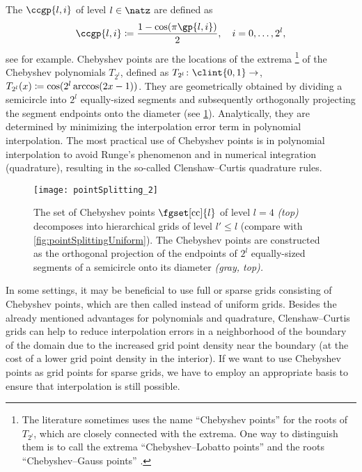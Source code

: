 The  $\ccgp{l,i}$ of level $l \in \natz$
are defined as
\begin{equation}
  \ccgp{l,i}
  \ceq \frac{1 - \cos(\pi \gp{l,i})}{2},\quad
  i = 0, \dotsc, 2^l,
\end{equation}
see \cite{Xu16Chebyshev} for example.
Chebyshev points are the locations of the extrema%
\footnote{%
  The literature sometimes uses the name ``Chebyshev points'' for
  the roots of $T_{2^l}$, which are closely connected with the extrema.
  One way to distinguish them is to call the extrema
  ``Chebyshev--Lobatto points'' and the roots
  ``Chebyshev--Gauss points'' \cite{Xu16Chebyshev}.%
}
of the Chebyshev polynomials $T_{2^l}$, defined as
$T_{2^l}\colon \clint{0, 1} \to \real$,
$T_{2^l}(x) \coloneqq \cos(2^l \arccos(2x - 1))$.
They are geometrically obtained
by dividing a semicircle into $2^l$ equally-sized
segments and subsequently orthogonally projecting the
segment endpoints onto the diameter
(see \cref{fig:pointSplittingChebyshev}).
Analytically, they are determined by minimizing
the interpolation error term in polynomial interpolation.
The most practical use of Chebyshev points is in
polynomial interpolation to avoid Runge's phenomenon and in
numerical integration (quadrature), resulting in the
so-called Clenshaw--Curtis quadrature rules.

\begin{SCfigure}
  \texttt{[image: pointSplitting\_2]}%
  \caption[%
    Decomposition of the set of univariate Clenshaw--Curtis grid points%
  ]{%
    The set of Chebyshev points $\fgset[\cc]{l}$ of level
    $l = 4$ \emph{(top)}
    decomposes into hierarchical grids of level $l' \le l$
    (compare with \cref{fig:pointSplittingUniform}).
    The Chebyshev points are constructed as
    the orthogonal projection of the
    endpoints of $2^l$ equally-sized segments
    of a semicircle onto its diameter \emph{\textcolor{C8}{(gray, top)}.}%
  }%
  \label{fig:pointSplittingChebyshev}%
\end{SCfigure}

In some settings, it may be beneficial to use full or sparse grids consisting
of Chebyshev points, which are then called 
instead of uniform grids.
Besides the already mentioned advantages for polynomials and
quadrature, Clenshaw--Curtis grids can help to reduce interpolation
errors in a neighborhood of the boundary of the domain due to the increased
grid point density near the boundary
(at the cost of a lower grid point density in the interior).
If we want to use Chebyshev points as grid points for sparse grids,
we have to employ an appropriate basis to ensure that interpolation
is still possible.

